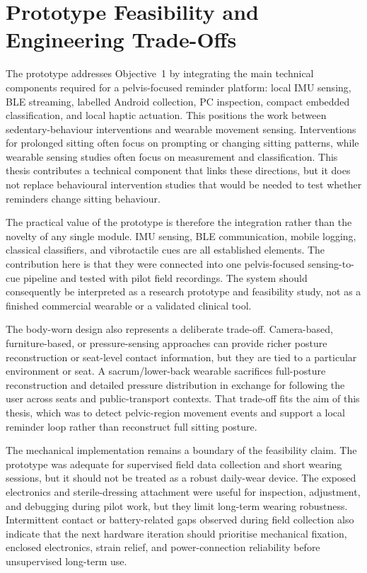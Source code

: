 \section{Prototype Feasibility and Engineering Trade-Offs}

The prototype addresses Objective~1 by integrating the main technical components required for a pelvis-focused reminder platform: local IMU sensing, BLE streaming, labelled Android collection, PC inspection, compact embedded classification, and local haptic actuation. This positions the work between sedentary-behaviour interventions and wearable movement sensing. Interventions for prolonged sitting often focus on prompting or changing sitting patterns, while wearable sensing studies often focus on measurement and classification. This thesis contributes a technical component that links these directions, but it does not replace behavioural intervention studies that would be needed to test whether reminders change sitting behaviour.

The practical value of the prototype is therefore the integration rather than the novelty of any single module. IMU sensing, BLE communication, mobile logging, classical classifiers, and vibrotactile cues are all established elements. The contribution here is that they were connected into one pelvis-focused sensing-to-cue pipeline and tested with pilot field recordings. The system should consequently be interpreted as a research prototype and feasibility study, not as a finished commercial wearable or a validated clinical tool.

The body-worn design also represents a deliberate trade-off. Camera-based, furniture-based, or pressure-sensing approaches can provide richer posture reconstruction or seat-level contact information, but they are tied to a particular environment or seat. A sacrum/lower-back wearable sacrifices full-posture reconstruction and detailed pressure distribution in exchange for following the user across seats and public-transport contexts. That trade-off fits the aim of this thesis, which was to detect pelvic-region movement events and support a local reminder loop rather than reconstruct full sitting posture.

The mechanical implementation remains a boundary of the feasibility claim. The prototype was adequate for supervised field data collection and short wearing sessions, but it should not be treated as a robust daily-wear device. The exposed electronics and sterile-dressing attachment were useful for inspection, adjustment, and debugging during pilot work, but they limit long-term wearing robustness. Intermittent contact or battery-related gaps observed during field collection also indicate that the next hardware iteration should prioritise mechanical fixation, enclosed electronics, strain relief, and power-connection reliability before unsupervised long-term use.

